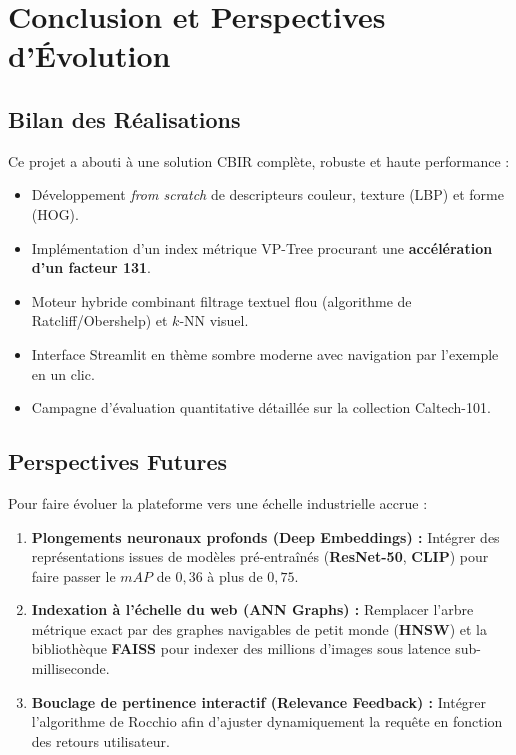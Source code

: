 \section{Conclusion et Perspectives d'Évolution}

\subsection{Bilan des Réalisations}
Ce projet a abouti à une solution CBIR complète, robuste et haute performance :
\begin{itemize}[label=\checkmark, nosep]
    \item Développement \textit{from scratch} de descripteurs couleur, texture (LBP) et forme (HOG).
    \item Implémentation d'un index métrique VP-Tree procurant une \textbf{accélération d'un facteur 131}.
    \item Moteur hybride combinant filtrage textuel flou (algorithme de Ratcliff/Obershelp) et $k$-NN visuel.
    \item Interface Streamlit en thème sombre moderne avec navigation par l'exemple en un clic.
    \item Campagne d'évaluation quantitative détaillée sur la collection Caltech-101.
\end{itemize}

\subsection{Perspectives Futures}
Pour faire évoluer la plateforme vers une échelle industrielle accrue :
\begin{enumerate}[nosep]
    \item \textbf{Plongements neuronaux profonds (Deep Embeddings) :} Intégrer des représentations issues de modèles pré-entraînés (\textbf{ResNet-50}, \textbf{CLIP}) pour faire passer le $mAP$ de $0{,}36$ à plus de $0{,}75$.
    \item \textbf{Indexation à l'échelle du web (ANN Graphs) :} Remplacer l'arbre métrique exact par des graphes navigables de petit monde (\textbf{HNSW}) et la bibliothèque \textbf{FAISS} pour indexer des millions d'images sous latence sub-milliseconde.
    \item \textbf{Bouclage de pertinence interactif (Relevance Feedback) :} Intégrer l'algorithme de Rocchio afin d'ajuster dynamiquement la requête en fonction des retours utilisateur.
\end{enumerate}
